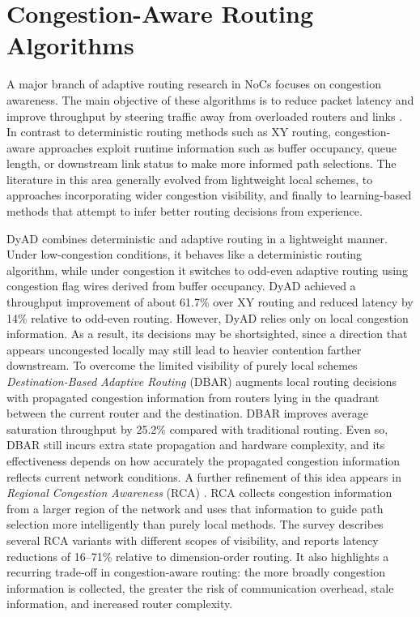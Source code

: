 \section{Congestion-Aware Routing Algorithms}

A major branch of adaptive routing research in NoCs focuses on congestion awareness. The main objective of these algorithms is to reduce packet latency and improve throughput by steering traffic away from overloaded routers and links \cite{Kondoth2026}. In contrast to deterministic routing methods such as XY routing, congestion-aware approaches exploit runtime information such as buffer occupancy, queue length, or downstream link status to make more informed path selections. The literature in this area generally evolved from lightweight local schemes, to approaches incorporating wider congestion visibility, and finally to learning-based methods that attempt to infer better routing decisions from experience.

DyAD \cite{Hu2004} combines deterministic and adaptive routing in a lightweight manner. Under low-congestion conditions, it behaves like a deterministic routing algorithm, while under congestion it switches to odd-even adaptive routing using congestion flag wires derived from buffer occupancy. DyAD achieved a throughput improvement of about 61.7\% over XY routing and reduced latency by 14\% relative to odd-even routing. However, DyAD relies only on local congestion information. As a result, its decisions may be shortsighted, since a direction that appears uncongested locally may still lead to heavier contention farther downstream. To overcome the limited visibility of purely local schemes \textit{Destination-Based Adaptive Routing} (DBAR) \cite{Ma2011} augments local routing decisions with propagated congestion information from routers lying in the quadrant between the current router and the destination. DBAR improves average saturation throughput by 25.2\% compared with traditional routing. Even so, DBAR still incurs extra state propagation and hardware complexity, and its effectiveness depends on how accurately the propagated congestion information reflects current network conditions. A further refinement of this idea appears in \textit{Regional Congestion Awareness} (RCA) \cite{Gratz2008}. RCA collects congestion information from a larger region of the network and uses that information to guide path selection more intelligently than purely local methods. The survey describes several RCA variants with different scopes of visibility, and reports latency reductions of 16--71\% relative to dimension-order routing. It also highlights a recurring trade-off in congestion-aware routing: the more broadly congestion information is collected, the greater the risk of communication overhead, stale information, and increased router complexity.

